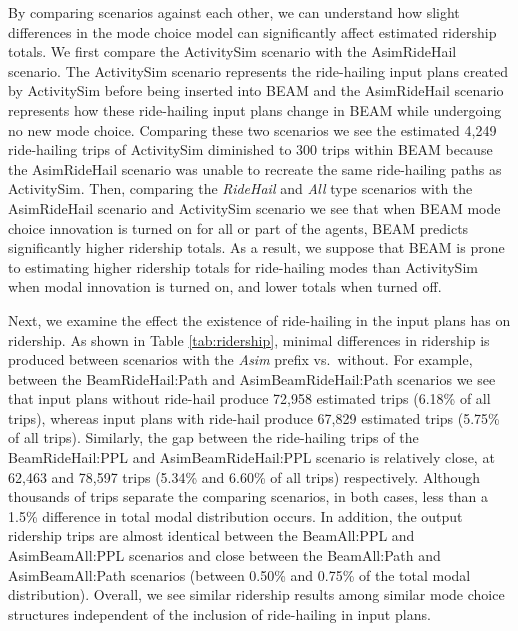 \documentclass[simple, masters, twoside]{byuthesis}
\begin{document}
By comparing scenarios against each other, we can understand how slight differences in the mode choice model can significantly affect estimated ridership totals. We first compare the ActivitySim scenario with the AsimRideHail scenario. The ActivitySim scenario represents the ride-hailing input plans created by ActivitySim before being inserted into BEAM and the AsimRideHail scenario represents how these ride-hailing input plans change in BEAM while undergoing no new mode choice. Comparing these two scenarios we see the estimated 4,249 ride-hailing trips of ActivitySim diminished to 300 trips within BEAM because the AsimRideHail scenario was unable to recreate the same ride-hailing paths as ActivitySim. Then, comparing the \emph{RideHail} and \emph{All} type scenarios with the AsimRideHail scenario and ActivitySim scenario we see that when BEAM mode choice innovation is turned on for all or part of the agents, BEAM predicts significantly higher ridership totals. As a result, we suppose that BEAM is prone to estimating higher ridership totals for ride-hailing modes than ActivitySim when modal innovation is turned on, and lower totals when turned off.

Next, we examine the effect the existence of ride-hailing in the input plans has on ridership. As shown in Table \ref{tab:ridership}, minimal differences in ridership is produced between scenarios with the \emph{Asim} prefix vs.~without. For example, between the BeamRideHail:Path and AsimBeamRideHail:Path scenarios we see that input plans without ride-hail produce 72,958 estimated trips (6.18\% of all trips), whereas input plans with ride-hail produce 67,829 estimated trips (5.75\% of all trips). Similarly, the gap between the ride-hailing trips of the BeamRideHail:PPL and AsimBeamRideHail:PPL scenario is relatively close, at 62,463 and 78,597 trips (5.34\% and 6.60\% of all trips) respectively. Although thousands of trips separate the comparing scenarios, in both cases, less than a 1.5\% difference in total modal distribution occurs. In addition, the output ridership trips are almost identical between the BeamAll:PPL and AsimBeamAll:PPL scenarios and close between the BeamAll:Path and AsimBeamAll:Path scenarios (between 0.50\% and 0.75\% of the total modal distribution). Overall, we see similar ridership results among similar mode choice structures independent of the inclusion of ride-hailing in input plans.
\end{document}
